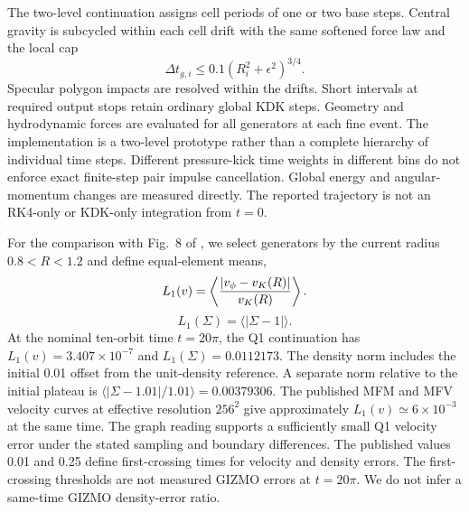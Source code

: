 \documentclass[twocolumn]{aastex63}
\begin{document}
The two-level continuation assigns cell periods of one or two base steps.
Central gravity is subcycled within each cell drift with the same softened
force law and the local cap
\begin{equation}
  \Delta t_{g,i}\le0.1(R_i^2+\epsilon^2)^{3/4}.
  \label{eq:kepler_gravity_cap}
\end{equation}
Specular polygon impacts are resolved within the drifts. Short intervals
at required output stops retain ordinary global KDK steps. Geometry and
hydrodynamic forces are evaluated for all generators at each fine event.
The implementation is a two-level prototype rather than a complete hierarchy
of individual time steps. Different pressure-kick time weights in different
bins do not enforce exact finite-step pair impulse cancellation. Global
energy and angular-momentum changes are measured directly. The reported
trajectory is not an RK4-only or KDK-only integration from $t=0$.

For the comparison with Fig.~8 of \citet{Hopkins2015}, we select generators
by the current radius $0.8<R<1.2$ and define equal-element means,
\begin{equation}
  L_1(v)=\left\langle {|v_\phi-v_K(R)|\over v_K(R)}\right\rangle.
  \label{eq:kepler_l1v}
\end{equation}
\begin{equation}
  L_1(\Sigma)=\langle|\Sigma-1|\rangle.
  \label{eq:kepler_l1rho}
\end{equation}
At the nominal ten-orbit time $t=20\pi$, the Q1 continuation has
$L_1(v)=3.407\times10^{-7}$ and $L_1(\Sigma)=0.0112173$.
The density norm includes the initial 0.01 offset from the unit-density
reference. A separate norm relative to the initial plateau is
$\langle|\Sigma-1.01|/1.01\rangle=0.00379306$.
The published MFM and MFV velocity curves at effective resolution $256^2$
give approximately $L_1(v)\simeq6\times10^{-3}$ at the same time.
The graph reading supports a sufficiently small Q1 velocity error under
the stated sampling and boundary differences. The published values 0.01
and 0.25 define first-crossing times for velocity and density errors.
The first-crossing thresholds are not measured GIZMO errors at $t=20\pi$.
We do not infer a same-time GIZMO density-error ratio.
\end{document}
